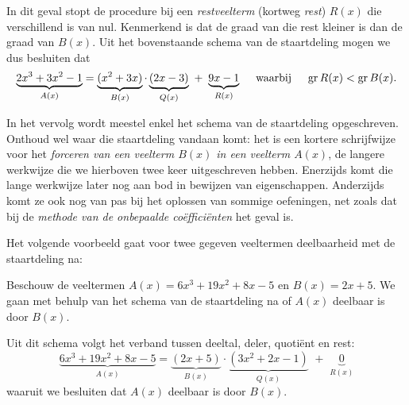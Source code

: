 \documentclass{ximera}
\begin{document}
\begin{algorithm}

	In dit geval stopt de procedure bij een \textit{ restveelterm} (kortweg \textit{ rest}) $R(x)$ die verschillend is van nul. Kenmerkend is dat de graad van die rest kleiner is dan de graad van $B(x)$. Uit het bovenstaande schema van de staartdeling mogen we dus besluiten dat
	\[
	\underbrace{2x^3+3x^2-1}_{A(x)} = \underbrace{(x^2+3x)}_{B(x)}\cdot\underbrace{(2x - 3)}_{Q(x)} \,\, + \,\, \underbrace{9x - 1}_{R(x)} \quad \text{ waarbij } \quad \operatorname{gr} R(x) < \operatorname{gr} B(x).
	\]

	\end{algorithm} 
	
	In het vervolg wordt meestel enkel het schema van de staartdeling opgeschreven. Onthoud wel waar die staartdeling vandaan komt: het is een kortere schrijfwijze voor het \textit{ forceren van een veelterm $B(x)$ in een veelterm $A(x)$}, de langere werkwijze die we hierboven twee keer uitgeschreven hebben. Enerzijds komt die lange werkwijze later nog aan bod in bewijzen van eigenschappen. Anderzijds komt ze ook nog van pas bij het oplossen van sommige oefeningen, net zoals dat bij de \textit{methode van de onbepaalde coëfficiënten} het geval is.
	
	


	Het volgende voorbeeld gaat voor twee gegeven veeltermen deelbaarheid met de staartdeling na: 


	\begin{example} 
	Beschouw de veeltermen $A(x) = 6x^3 + 19x^2 + 8x - 5$ en $B(x) = 2x+5$. We gaan met behulp van het schema van de staartdeling na of $A(x)$ deelbaar is door $B(x)$. 
	
	
	Uit dit schema volgt het verband tussen deeltal, deler, quotiënt en rest:
	\[
	\underbrace{6x^3 + 19x^2 + 8x - 5}_{A(x)} = \underbrace{(2x+5)}_{B(x)}\cdot\underbrace{(3x^2+2x-1)}_{Q(x)} \,\, + \,\, \underbrace{0}_{R(x)} 
	\]
	waaruit we besluiten dat $A(x)$ deelbaar is door $B(x)$.
	\end{example} 
\end{document}
